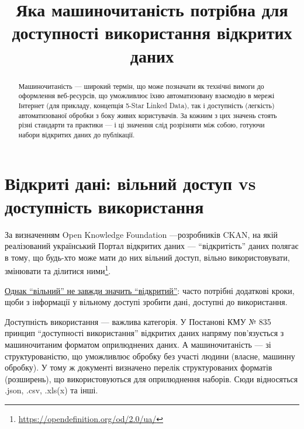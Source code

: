 \documentclass[
]{agujournal2019}
\begin{document}
\title{Яка машиночитаність потрібна для доступності використання
відкритих даних}



\begin{abstract}
Машиночитаність --- широкий термін, що може позначати як технічні вимоги
до оформлення веб-ресурсів, що уможливлює їхню автоматизовану взаємодію
в мережі Інтернет (для прикладу, концепція 5-Star Linked Data), так і
доступність (легкість) автоматизованої обробки з боку живих
користувачів. За кожним з цих значень стоять різні стандарти та практики
--- і ці значення слід розрізняти між собою, готуючи набори відкритих
даних до публікації.
\end{abstract}





\section{Відкриті дані: вільний доступ vs доступність
використання}\label{ux432ux456ux434ux43aux440ux438ux442ux456-ux434ux430ux43dux456-ux432ux456ux43bux44cux43dux438ux439-ux434ux43eux441ux442ux443ux43f-vs-ux434ux43eux441ux442ux443ux43fux43dux456ux441ux442ux44c-ux432ux438ux43aux43eux440ux438ux441ux442ux430ux43dux43dux44f}

За визначенням Open Knowledge Foundation ---розробників CKAN, на якій
реалізований український Портал відкритих даних --- ``відкритість''
даних полягає в тому, що будь-хто може мати до них вільний доступ,
вільно використовувати, змінювати та ділитися ними\footnote{\url{https://opendefinition.org/od/2.0/ua/}}.

\href{https://aims.gitbook.io/open-data-mooc/unit-1-open-data-principles/lesson-1.1-what-is-open-data\#id-5.-challenges}{Однак
``вільний'' не завжди значить ``відкритий''}: часто потрібні додаткові
кроки, щоби з інформації у вільному доступі зробити дані, доступні до
використання.

Доступність використання --- важлива категорія. У Постанові КМУ № 835
принцип ``доступності використання'' відкритих даних напряму
пов'язується з машиночитаним форматом оприлюднених даних. А
машиночитаність --- зі структурованістю, що уможливлює обробку без
участі людини (власне, машинну обробку). У тому ж документі визначено
перелік структурованих форматів (розширень), що використовуються для
оприлюднення наборів. Сюди відносяться .json, .csv, .xls(x) та інші.
\end{document}

